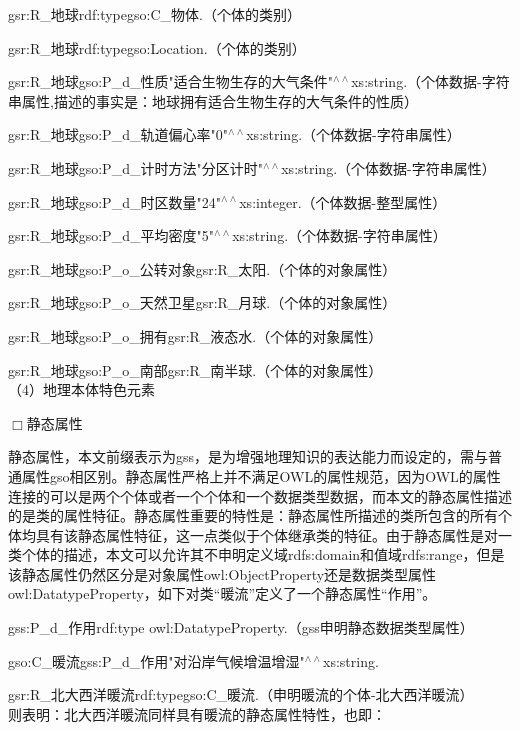 gsr:R\_地球\quad rdf:type\quad gso:C\_物体\quad .（个体的类别）

gsr:R\_地球\quad rdf:type\quad gso:Location\quad .（个体的类别）

gsr:R\_地球\quad gso:P\_d\_性质\quad "适合生物生存的大气条件"$^{\land\land}$xs:string\quad .（个体数据-字符串属性,描述的事实是：地球拥有适合生物生存的大气条件的性质）

gsr:R\_地球\quad gso:P\_d\_轨道偏心率\quad "0"$^{\land\land}$xs:string\quad .（个体数据-字符串属性）

gsr:R\_地球\quad gso:P\_d\_计时方法\quad "分区计时"$^{\land\land}$xs:string\quad .（个体数据-字符串属性）

gsr:R\_地球\quad gso:P\_d\_时区数量\quad "24"$^{\land\land}$xs:integer\quad .（个体数据-整型属性）

gsr:R\_地球\quad gso:P\_d\_平均密度\quad "5"$^{\land\land}$xs:string\quad .（个体数据-字符串属性）

gsr:R\_地球\quad gso:P\_o\_公转对象\quad gsr:R\_太阳\quad .（个体的对象属性）

gsr:R\_地球\quad gso:P\_o\_天然卫星\quad gsr:R\_月球\quad .（个体的对象属性）

gsr:R\_地球\quad gso:P\_o\_拥有\quad gsr:R\_液态水\quad .（个体的对象属性）

gsr:R\_地球\quad gso:P\_o\_南部\quad gsr:R\_南半球\quad .（个体的对象属性）
\\

（4）地理本体特色元素

$\Box$静态属性
		
静态属性，本文前缀表示为gss，是为增强地理知识的表达能力而设定的，需与普通属性gso相区别。静态属性严格上并不满足OWL的属性规范，因为OWL的属性连接的可以是两个个体或者一个个体和一个数据类型数据，而本文的静态属性描述的是类的属性特征。静态属性重要的特性是：静态属性所描述的类所包含的所有个体均具有该静态属性特征，这一点类似于个体继承类的特征。由于静态属性是对一类个体的描述，本文可以允许其不申明定义域rdfs:domain和值域rdfs:range，但是该静态属性仍然区分是对象属性owl:ObjectProperty还是数据类型属性owl:DatatypeProperty，如下对类“暖流”定义了一个静态属性“作用”。

gss:P\_d\_作用\quad rdf:type \quad owl:DatatypeProperty\quad .（gss申明静态数据类型属性）

gso:C\_暖流\quad gss:P\_d\_作用\quad "对沿岸气候增温增湿"$^{\land\land}$xs:string\quad .

gsr:R\_北大西洋暖流\quad rdf:type\quad gso:C\_暖流.（申明暖流的个体-北大西洋暖流）
\\
则表明：北大西洋暖流同样具有暖流的静态属性特性，也即：

